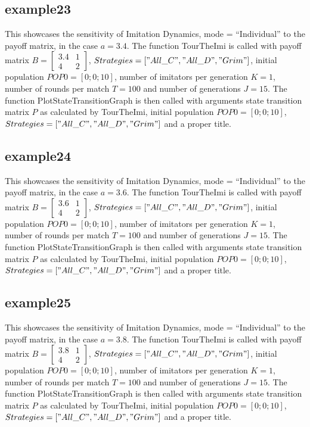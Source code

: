 \subsection{example23}
This showcases the sensitivity of Imitation Dynamics, mode = ``Individual'' to the payoff matrix, in the case $a = 3.4$. The function TourTheImi is called with payoff matrix $B = \begin{bmatrix} 3.4 & 1 \\ 4 & 2 \end{bmatrix}$, $Strategies = ["All\_C", "All\_D", "Grim"]$, initial population $POP0 = [0; 0; 10]$, number of imitators per generation $K=1$, number of rounds per match $T = 100$ and number of generations $J = 15$. The function PlotStateTransitionGraph is then called with arguments state transition matrix $P$ as calculated by TourTheImi, initial population $POP0 = [0; 0; 10]$, $Strategies = ["All\_C", "All\_D", "Grim"]$ and a proper title.

\subsection{example24}
This showcases the sensitivity of Imitation Dynamics, mode = ``Individual'' to the payoff matrix, in the case $a = 3.6$. The function TourTheImi is called with payoff matrix $B = \begin{bmatrix} 3.6 & 1 \\ 4 & 2 \end{bmatrix}$, $Strategies = ["All\_C", "All\_D", "Grim"]$, initial population $POP0 = [0; 0; 10]$, number of imitators per generation $K=1$, number of rounds per match $T = 100$ and number of generations $J = 15$. The function PlotStateTransitionGraph is then called with arguments state transition matrix $P$ as calculated by TourTheImi, initial population $POP0 = [0; 0; 10]$, $Strategies = ["All\_C", "All\_D", "Grim"]$ and a proper title.

\subsection{example25}
This showcases the sensitivity of Imitation Dynamics, mode = ``Individual'' to the payoff matrix, in the case $a = 3.8$. The function TourTheImi is called with payoff matrix $B = \begin{bmatrix} 3.8 & 1 \\ 4 & 2 \end{bmatrix}$, $Strategies = ["All\_C", "All\_D", "Grim"]$, initial population $POP0 = [0; 0; 10]$, number of imitators per generation $K=1$, number of rounds per match $T = 100$ and number of generations $J = 15$. The function PlotStateTransitionGraph is then called with arguments state transition matrix $P$ as calculated by TourTheImi, initial population $POP0 = [0; 0; 10]$, $Strategies = ["All\_C", "All\_D", "Grim"]$ and a proper title.

